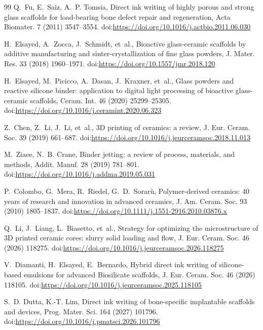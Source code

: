 \documentclass[11pt]{article}
\begin{document}
\begin{thebibliography}{99}
Q.~Fu, E.~Saiz, A.~P. Tomsia, Direct ink writing of highly porous and strong glass scaffolds for load-bearing bone defect repair and regeneration, Acta Biomater. 7 (2011) 3547--3554.
\newblock doi:\url{https://doi.org/10.1016/j.actbio.2011.06.030}


H.~Elsayed, A.~Zocca, J.~Schmidt, et~al., Bioactive glass-ceramic scaffolds by additive manufacturing and sinter-crystallization of fine glass powders, J. Mater. Res. 33 (2018) 1960--1971.
\newblock doi:\url{https://doi.org/10.1557/jmr.2018.120}


H.~Elsayed, M.~Picicco, A.~Dasan, J.~Kraxner, et~al., Glass powders and reactive silicone binder: application to digital light processing of bioactive glass-ceramic scaffolds, Ceram. Int. 46 (2020) 25299--25305.
\newblock doi:\url{https://doi.org/10.1016/j.ceramint.2020.06.323}


Z.~Chen, Z.~Li, J.~Li, et~al., 3D printing of ceramics: a review, J. Eur. Ceram. Soc. 39 (2019) 661--687.
\newblock doi:\url{https://doi.org/10.1016/j.jeurceramsoc.2018.11.013}


M.~Ziaee, N.~B. Crane, Binder jetting: a review of process, materials, and methods, Addit. Manuf. 28 (2019) 781--801.
\newblock doi:\url{https://doi.org/10.1016/j.addma.2019.05.031}


P.~Colombo, G.~Mera, R.~Riedel, G.~D.~Sorar\`u, Polymer-derived ceramics: 40 years of research and innovation in advanced ceramics, J. Am. Ceram. Soc. 93 (2010) 1805--1837.
\newblock doi:\url{https://doi.org/10.1111/j.1551-2916.2010.03876.x}


Q.~Li, J.~Liang, L.~Biasetto, et~al., Strategy for optimizing the microstructure of 3D printed ceramic cores: slurry solid loading and flow, J. Eur. Ceram. Soc. 46 (2026) 118275.
\newblock doi:\url{https://doi.org/10.1016/j.jeurceramsoc.2026.118275}


V.~Diamanti, H.~Elsayed, E.~Bernardo, Hybrid direct ink writing of silicone-based emulsions for advanced Biosilicate scaffolds, J. Eur. Ceram. Soc. 46 (2026) 118105.
\newblock doi:\url{https://doi.org/10.1016/j.jeurceramsoc.2025.118105}


S.~D. Dutta, K.-T. Lim, Direct ink writing of bone-specific implantable scaffolds and devices, Prog. Mater. Sci. 164 (2027) 101796.
\newblock doi:\url{https://doi.org/10.1016/j.pmatsci.2026.101796}



\end{thebibliography}
\end{document}
